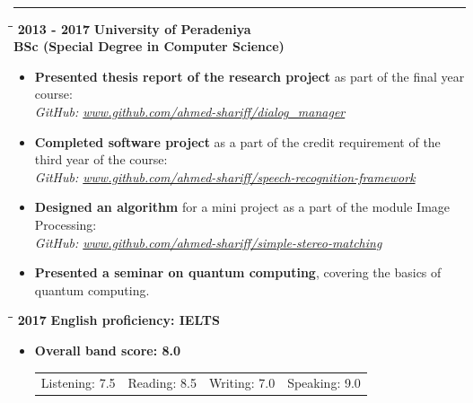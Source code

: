 \documentclass[a4paper,11pt]{article}
\begin{document}
\noindent
\textbf{\color{MidnightBlue}\large{}}
\vspace{-8pt}\noindent\\\rule{0.75\textwidth}{0.4pt}
\vspace{-5pt}
\begin{tabbing}
  \=\hspace*{3cm}\=\hspace*{3cm}\= \kill
  \>\textbf{\large \textbar{}}\textbf{ 2013 - 2017} \> \textbf{University of Peradeniya} \\ \> \> \textbf{BSc (Special Degree in Computer Science)}
\end{tabbing}
\begin{itemize}
\item \textbf{Presented thesis report of the research project} as part of the final year course:\\
  \emph{GitHub: \url{www.github.com/ahmed-shariff/dialog_manager}}
\item \textbf{Completed software project} as a part of the credit requirement of the third year of the course:\\
  \emph{GitHub: \url{www.github.com/ahmed-shariff/speech-recognition-framework}}
\item \textbf{Designed an algorithm} for a mini project as a part of the module Image Processing: \\
  \emph{GitHub: \url{www.github.com/ahmed-shariff/simple-stereo-matching}}
\item \textbf{Presented a seminar on quantum computing}, covering the basics of quantum computing.
\end{itemize}

\vspace{0pt}
\begin{tabbing}
  \=\hspace*{3cm}\=\hspace*{3cm}\= \kill
  \>\textbf{\large \textbar{}}\textbf{ 2017} \> \textbf{English proficiency: IELTS}
\end{tabbing}
\vspace{-20pt}
\begin{itemize}
\item[]\textbf{Overall band score: 8.0}\\
  \vspace{-10pt}
  \begin{tabular}{ m{} m{} m{} m{} }%
    \hspace{-8pt}Listening: 7.5 & Reading: 8.5 & Writing: 7.0 & Speaking: 9.0\\
  \end{tabular}
\end{itemize}
\end{document}
